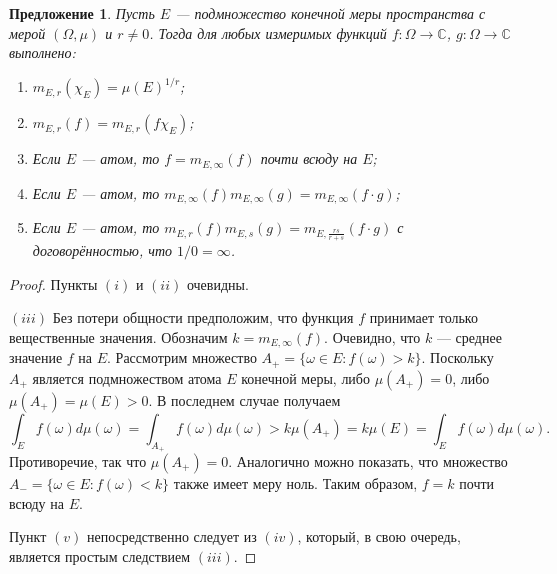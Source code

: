 \documentclass[12pt]{article}
\newtheorem{proposition}[theorem]{Предложение}
\begin{document}
\begin{proposition}\label{GnrlzdMeanProp}
    Пусть $E$ --- подмножество конечной меры пространства с мерой $(\Omega,\mu)$ 
    и $r\neq 0$. Тогда для любых измеримых 
    функций $f:\Omega\to\mathbb{C}$, $g:\Omega\to\mathbb{C}$ выполнено:
    \begin{enumerate}[label = (\roman*)]
        \item $m_{E,r}(\chi_E)=\mu(E)^{1/r}$;
        \item $m_{E,r}(f)=m_{E,r}(f\chi_E)$;
        \item Если $E$ --- атом, то $f=m_{E,\infty}(f)$ почти всюду на $E$;
        \item Если $E$ --- атом, 
        то $m_{E,\infty}(f)m_{E,\infty}(g)=m_{E,\infty}(f\cdot g)$;
        \item Если $E$ --- атом, 
        то $m_{E,r}(f)m_{E,s}(g)=m_{E,\frac{rs}{r+s}}(f\cdot g)$ с 
        договорённостью, что $1/0=\infty$.
    \end{enumerate}
\end{proposition}
\begin{proof}
    Пункты $(i)$ и $(ii)$ очевидны.

    $(iii)$ Без потери общности предположим, что функция $f$ принимает только 
    вещественные значения. Обозначим $k=m_{E,\infty}(f)$. Очевидно, 
    что $k$ --- среднее значение $f$ на $E$. Рассмотрим 
    множество $A_+=\{\omega\in E: f(\omega)>k\}$. Поскольку $A_+$ является 
    подмножеством атома $E$ конечной меры, либо $\mu(A_+)=0$, 
    либо $\mu(A_+)=\mu(E)>0$. В последнем случае получаем
    \[
        \int_E f(\omega)d\mu(\omega)
        =\int_{A_+}f(\omega)d\mu(\omega)
        >k\mu(A_+)
        =k\mu(E)
        =\int_E f(\omega)d\mu(\omega).
    \]
    Противоречие, так что $\mu(A_+)=0$. Аналогично можно показать, что 
    множество $A_-=\{\omega\in E:f(\omega)<k\}$ также имеет меру ноль. 
    Таким образом, $f=k$ почти всюду на $E$.

    Пункт $(v)$ непосредственно следует из $(iv)$, который, в свою очередь, 
    является простым следствием $(iii)$.
\end{proof}
\end{document}
